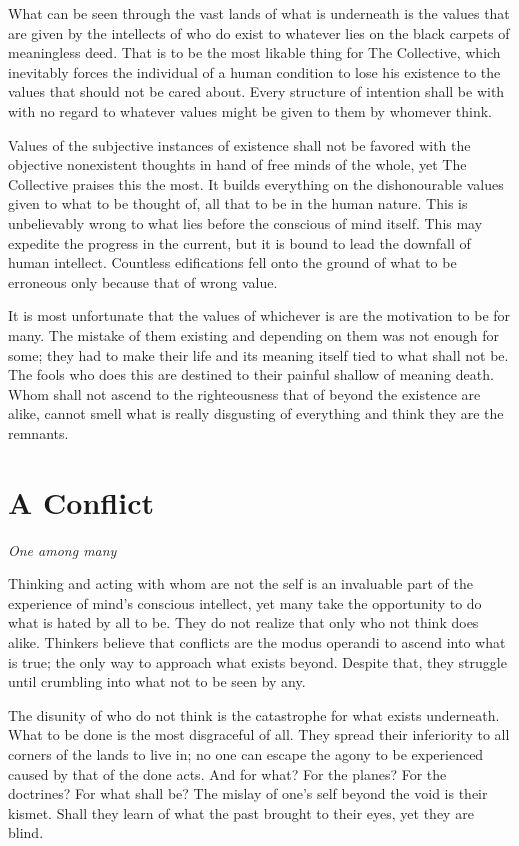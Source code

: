 \documentclass[oneside]{book}
\begin{document}
What can be seen through the vast lands of what is underneath is the values that
are given by the intellects of who do exist to whatever lies on the black
carpets of meaningless deed. That is to be the most likable thing for The
Collective, which inevitably forces the individual of a human condition to lose
his existence to the values that should not be cared about. Every structure of
intention shall be with with no regard to whatever values might be given to them
by whomever think.

Values of the subjective instances of existence shall not be favored with the
objective nonexistent thoughts in hand of free minds of the whole, yet The
Collective praises this the most. It builds everything on the dishonourable
values given to what to be thought of, all that to be in the human nature. This
is unbelievably wrong to what lies before the conscious of mind itself. This may
expedite the progress in the current, but it is bound to lead the downfall of
human intellect. Countless edifications fell onto the ground of what to be
erroneous only because that of wrong value.

It is most unfortunate that the values of whichever is are the motivation to be
for many. The mistake of them existing and depending on them was not enough for
some; they had to make their life and its meaning itself tied to what shall not
be. The fools who does this are destined to their painful shallow of meaning
death. Whom shall not ascend to the righteousness that of beyond the existence
are alike, cannot smell what is really disgusting of everything and think they
are the remnants.

\section{A Conflict}
\textit{One among many}

Thinking and acting with whom are not the self is an invaluable part of the
experience of mind's conscious intellect, yet many take the opportunity to do
what is hated by all to be. They do not realize that only who not think does
alike. Thinkers believe that conflicts are the modus operandi to ascend into
what is true; the only way to approach what exists beyond. Despite that, they
struggle until crumbling into what not to be seen by any.

The disunity of who do not think is the catastrophe for what exists underneath.
What to be done is the most disgraceful of all. They spread their inferiority to
all corners of the lands to live in; no one can escape the agony to be
experienced caused by that of the done acts. And for what? For the planes? For
the doctrines? For what shall be? The mislay of one's self beyond the void is
their kismet. Shall they learn of what the past brought to their eyes, yet they
are blind.
\end{document}
